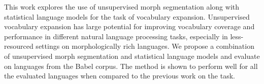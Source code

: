 This work explores the use of unsupervised morph segmentation along with statistical language models for the task of vocabulary expansion. Unsupervised vocabulary expansion has large potential for improving vocabulary coverage and performance in different natural language processing tasks, especially in less-resourced settings on morphologically rich languages. We propose a combination of unsupervised morph segmentation and statistical language models and evaluate on languages from the Babel corpus. The method is shown to perform well for all the evaluated languages when compared to the previous work on the task.
